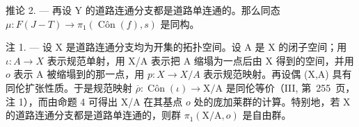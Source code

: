 推论 2. --- 再设 Y 的道路连通分支都是道路单连通的。那么同态 \(\mu\colon F(J-T)\to\pi_{1}(\operatorname{Côn}(f),s)\) 是同构。

注 1. --- 设 X 是道路连通分支均为开集的拓扑空间。设 A 是 X 的闭子空间；用 \(\iota\colon A\to X\) 表示规范单射，用 X/A 表示把 A 缩塌为一点后由 X 得到的空间，并用 \(o\) 表示 A 被缩塌到的那一点，用 \(p\colon X\to X / A\) 表示规范映射。再设偶 (X,A) 具有同伦扩张性质。于是规范映射 \(\overline{\rho}\colon \operatorname{Côn}(\iota)\to \mathrm{X} / \mathrm{A}\) 是同伦等价（III, 第~255~页，注 1），而由命题 4 可得出 X/A 在其基点 \(o\) 处的庞加莱群的计算。特别地，若 X 的道路连通分支都是道路单连通的，则群 \(\pi_1(\mathrm{X / A},o)\) 是自由群。
\relax{}
